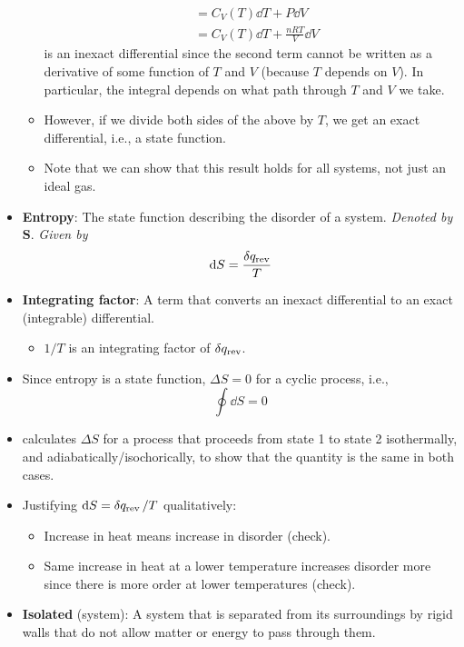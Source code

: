 \documentclass[../notes.tex]{subfiles}
\begin{document}
\begin{itemize}
\begin{itemize}
\begin{align*}
            &= C_V(T)\dd{T}+P\dd{V}\\
            &= C_V(T)\dd{T}+\frac{nRT}{V}\dd{V}
        \end{align*}
        is an inexact differential since the second term cannot be written as a derivative of some function of $T$ and $V$ (because $T$ depends on $V$). In particular, the integral depends on what path through $T$ and $V$ we take.
        \item However, if we divide both sides of the above by $T$, we get an exact differential, i.e., a state function.
        \item Note that we can show that this result holds for all systems, not just an ideal gas.
    \end{itemize}
    \item \textbf{Entropy}: The state function describing the disorder of a system. \emph{Denoted by} $\bm{S}$. \emph{Given by}
    \begin{equation*}
        \dd{S} = \frac{\var{q_\text{rev}}}{T}
    \end{equation*}
    \item \textbf{Integrating factor}: A term that converts an inexact differential to an exact (integrable) differential.
    \begin{itemize}
        \item $1/T$ is an integrating factor of $\var{q_\text{rev}}$.
    \end{itemize}
    \item Since entropy is a state function, $\Delta S=0$ for a cyclic process, i.e.,
    \begin{equation*}
        \oint\dd{S} = 0
    \end{equation*}
    \item \textcite{bib:McQuarrieSimon} calculates $\Delta S$ for a process that proceeds from state 1 to state 2 isothermally, and adiabatically/isochorically, to show that the quantity is the same in both cases.
    \item Justifying $\dd{S}=\var{q_\text{rev}}/T$ qualitatively:
    \begin{itemize}
        \item Increase in heat means increase in disorder (check).
        \item Same increase in heat at a lower temperature increases disorder more since there is more order at lower temperatures (check).
    \end{itemize}
    \item \textbf{Isolated} (system): A system that is separated from its surroundings by rigid walls that do not allow matter or energy to pass through them.

\end{itemize}
\end{document}
